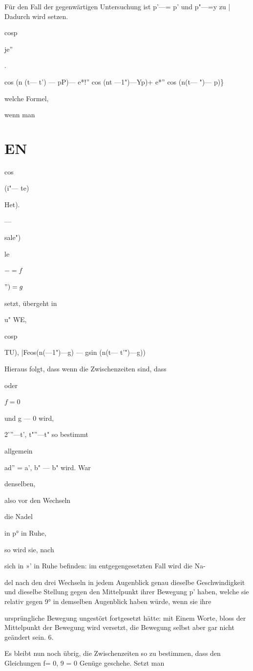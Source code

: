 \documentclass[12pt,a4paper]{article}
\begin{document}
Für den Fall der gegenwärtigen Untersuchung ist p’—= p’ und p"—=y zu | Dadurch wird setzen.

cosp

je”

.

cos (n (t— t') — pP)— e*!” cos (nt —1")—Yp)+ e*” cos (n(t— ")— p)\}

welche Formel,

wenn man

\section*{EN}
cos

(i"— te)

Het).

—

sale")

le

$-=f$

$")=g$

setzt, übergeht in

u" WE,

cosp

TU), |Feos(n(—1")—g) — gsin (n(t— t'")—g))

Hieraus folgt, dass wenn die Zwischenzeiten sind, dass

oder

$f=0$

und g — 0 wird,

2’”—t’, t"”—t" so bestimmt

allgemein

ad” = a’, b" — b" wird. War

denselben,

also vor den Wechseln

die Nadel

in p° in Ruhe,

so wird sie, nach

sich in »' in Ruhe befinden: im entgegengesetzten Fall wird die Na-

del nach den drei Wechseln in jedem Augenblick genau dieselbe Geschwindigkeit und dieselbe Stellung gegen den Mittelpunkt ihrer Bewegung p’ haben, welche sie relativ gegen 9° in demselben Augenblick haben würde, wenn sie ihre

ursprüngliche Bewegung ungestört fortgesetzt hätte: mit Einem Worte, bloss der Mittelpunkt der Bewegung wird versetzt, die Bewegung selbst aber gar nicht geändert sein. 6.

Es bleibt nun noch übrig, die Zwischenzeiten so zu bestimmen, dass den Gleichungen f= 0, 9 = 0 Genüge geschehe. Setzt man
\end{document}
